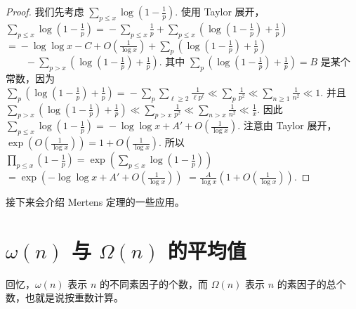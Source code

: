\begin{proof}
	我们先考虑
	\(\textstyle \sum_{p\leq\allowbreak{} x}\log\left(1-\frac1p\right).\)
	使用 Taylor 展开，
	\(\textstyle \sum_{p\leq\allowbreak{} x}\log\left(1-\frac1p\right) =\allowbreak{} -\sum_{p\leq\allowbreak{} x}\frac1p +\allowbreak{} \sum_{p\leq\allowbreak{} x} \left(\log\left(1-\frac1p\right)+\allowbreak{}\frac1p\right)\) \(\textstyle =\allowbreak{} -\log\log x-C+\allowbreak{}O\left(\frac1{\log x}\right) +\allowbreak{} \sum_p \left(\log\left(1-\frac1p\right)+\allowbreak{}\frac1p\right)\) \(\textstyle \qquad - \sum_{p>x} \left(\log\left(1-\frac1p\right)+\allowbreak{}\frac1p\right).\)
	其中
	\(\textstyle \sum_p \left(\log\left(1-\frac1p\right)+\allowbreak{}\frac1p\right)=\allowbreak{}B\)
	是某个常数，因为
	\(\textstyle \sum_p \left(\log\left(1-\frac1p\right)+\allowbreak{}\frac1p\right) =\allowbreak{} -\sum_p\sum_{\ell\geq\allowbreak{} 2}\frac1{\ell p^\ell} \ll\allowbreak{} \sum_p\frac1{p^2} \ll\allowbreak{} \sum_{n\geq\allowbreak{} 1}\frac1{n^2} \ll\allowbreak{} 1.\)
	并且
	\(\textstyle \sum_{p>x} \left(\log\left(1-\frac1p\right)+\allowbreak{}\frac1p\right) \ll\allowbreak{} \sum_{p>x}\frac1{p^2} \ll\allowbreak{} \sum_{n>x}\frac1{n^2} \ll\allowbreak{} \frac1x.\)
	因此
	\(\textstyle \sum_{p\leq\allowbreak{} x}\log\left(1-\frac1p\right) =\allowbreak{} -\log\log x+\allowbreak{}A' +\allowbreak{} O\left(\frac1{\log x}\right).\)
	注意由 Taylor 展开，
	\(\textstyle \exp\left(O\left(\frac1{\log x}\right)\right) =\allowbreak{} 1+\allowbreak{}O\left(\frac1{\log x}\right).\)
	所以
	\(\textstyle \prod_{p\leq\allowbreak{} x}\left(1-\frac1p\right) =\allowbreak{} \exp\left(\sum_{p\leq\allowbreak{} x}\log\left(1-\frac1p\right)\right)\) \(\textstyle =\allowbreak{} \exp\left( -\log\log x+\allowbreak{}A' +\allowbreak{} O\left(\frac1{\log x}\right) \right)\) \(\textstyle =\allowbreak{} \frac{A}{\log x} \left(1+\allowbreak{}O\left(\frac1{\log x}\right)\right).\)
\end{proof}

接下来会介绍 Mertens 定理的一些应用。


\section{\texorpdfstring{\(\omega(n)\) 与 \(\Omega(n)\) 的平均值}{omega(n) 与 Omega(n) 的平均值}}

回忆，$\omega(n)$ 表示 $n$ 的不同素因子的个数，而 $\Omega(n)$ 表示 $n$ 的素因子的总个数，也就是说按重数计算。


